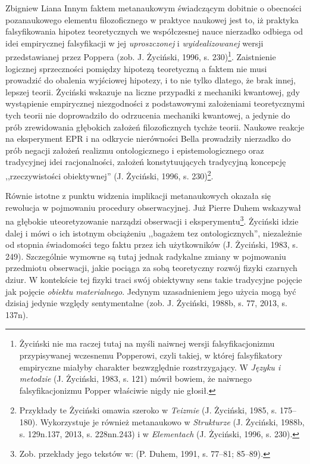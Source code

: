 \begin{artplenv}{Zbigniew Liana}
Innym faktem metanaukowym świadczącym dobitnie o obecności pozanaukowego elementu filozoficznego w praktyce naukowej
jest to, iż praktyka falsyfikowania hipotez teoretycznych we współczesnej nauce nierzadko odbiega od idei empirycznej
falsyfikacji w jej \textit{uproszczonej} i \textit{wyidealizowanej} wersji przedstawianej przez Poppera
\label{ref:RNDLar942AozJ}(zob. J. Życiński, 1996, s. 230)\footnote{Życiński nie ma raczej tutaj na myśli naiwnej wersji
falsyfikacjonizmu przypisywanej wczesnemu Popperowi, czyli takiej, w której falsyfikatory empiryczne miałyby charakter
bezwzględnie rozstrzygający. W \textit{Języku i metodzie} \label{ref:RNDyLCTuOy1b8}(J. Życiński, 1983, s. 121) mówił
bowiem, że naiwnego falsyfikacjonizmu Popper właściwie nigdy nie głosił.}. Zaistnienie logicznej sprzeczności pomiędzy
hipotezą teoretyczną a faktem nie musi prowadzić do obalenia wyjściowej hipotezy, i to nie tylko dlatego, że brak
innej, lepszej teorii. Życiński wskazuje na liczne przypadki z mechaniki kwantowej, gdy wystąpienie empirycznej
niezgodności z podstawowymi założeniami teoretycznymi tych teorii nie doprowadziło do odrzucenia mechaniki kwantowej, a jedynie
do prób zrewidowania głębokich założeń filozoficznych tychże teorii. Naukowe reakcje na eksperyment EPR i na
odkrycie nierówności Bella prowadziły nierzadko do prób negacji założeń realizmu ontologicznego i epistemologicznego
oraz tradycyjnej idei racjonalności, założeń konstytuujących tradycyjną koncepcję ,,rzeczywistości obiektywnej''
\label{ref:RND9B582PV6dW}(J. Życiński, 1996, s. 230)\footnote{Przykłady te Życiński omawia szeroko w \textit{Teizmie}
\label{ref:RNDeDVxzhZtXS}(J. Życiński, 1985, s. 175–180). Wykorzystuje je również metanaukowo w \textit{Strukturze}
\label{ref:RNDYDcMfhVjkQ}(J. Życiński, 1988b, s. 129n.137, 2013, s. 228nn.243) i w \textit{Elementach}
\label{ref:RNDMGOXueF4r7}(J. Życiński, 1996, s. 230).}.

Równie istotne z punktu widzenia implikacji metanaukowych okazała się rewolucja w pojmowaniu procedury obserwacyjnej.
Już Pierre Duhem wskazywał na głębokie uteoretyzowanie narządzi obserwacji i eksperymentu\footnote{Zob. przekłady jego
tekstów w: \label{ref:RND7H3en34uaC}(P. Duhem, 1991, s. 77–81; 85–89).}. Życiński idzie dalej i mówi o ich istotnym
obciążeniu ,,bagażem tez ontologicznych'', niezależnie od stopnia świadomości tego faktu przez ich użytkowników
\label{ref:RND1c8rmkjZxD}(J. Życiński, 1983, s. 249). Szczególnie wymowne są tutaj jednak radykalne zmiany w pojmowaniu
przedmiotu obserwacji, jakie pociąga za sobą teoretyczny rozwój fizyki czarnych dziur. W kontekście tej fizyki traci
swój obiektywny sens takie tradycyjne pojęcie jak pojęcie \textit{obiektu materialnego}. Jedynym uzasadnieniem jego
użycia mogą być dzisiaj jedynie względy sentymentalne \label{ref:RNDdNrJ37wYMr}(zob. J. Życiński, 1988b, s. 77, 2013,
s. 137n).


\end{artplenv}
